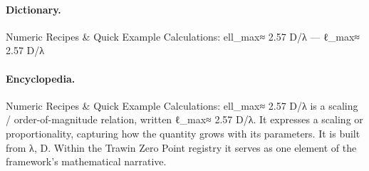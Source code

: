 \paragraph{Dictionary.}
Numeric Recipes \& Quick Example Calculations: ell\_max≈ 2.57 D/λ — ℓ\_max≈ 2.57 D/λ

\paragraph{Encyclopedia.}
Numeric Recipes \& Quick Example Calculations: ell\_max≈ 2.57 D/λ is a scaling / order-of-magnitude relation, written ℓ\_max≈ 2.57 D/λ. It expresses a scaling or proportionality, capturing how the quantity grows with its parameters. It is built from λ, D. Within the Trawin Zero Point registry it serves as one element of the framework's mathematical narrative.
